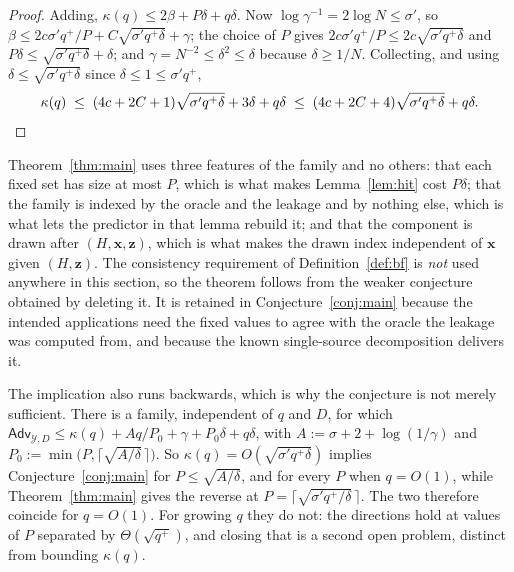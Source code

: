 \documentclass{conjura-conjecture}
\newcommand{\Adv}{\mathsf{Adv}}
\newcommand{\vx}{\mathbf{x}}
\newcommand{\vz}{\mathbf{z}}
\begin{document}
\begin{proof}
Adding, $\kappa(q) \le 2\beta + P\delta + q\delta$. Now
$\log \gamma^{-1} = 2\log N \le \sigma'$, so
$\beta \le 2c\sigma' q^{+}/P + C\sqrt{\sigma' q^{+}\delta} + \gamma$; the
choice of $P$ gives $2c\sigma' q^{+}/P \le 2c\sqrt{\sigma' q^{+}\delta}$
and $P\delta \le \sqrt{\sigma' q^{+}\delta} + \delta$; and
$\gamma = N^{-2} \le \delta^{2} \le \delta$ because $\delta \ge 1/N$.
Collecting, and using $\delta \le \sqrt{\sigma' q^{+}\delta}$ since
$\delta \le 1 \le \sigma' q^{+}$,
\[
  \kappa(q) \;\le\; (4c + 2C + 1)\sqrt{\sigma' q^{+}\delta}
  + 3\delta + q\delta
  \;\le\; (4c + 2C + 4)\sqrt{\sigma' q^{+}\delta} + q\delta . \qedhere
\]
\end{proof}

\begin{remark}\label{rem:uses}
Theorem~\ref{thm:main} uses three features of the family and no others: that
each fixed set has size at most $P$, which is what makes
Lemma~\ref{lem:hit} cost $P\delta$; that the family is indexed by the oracle
and the leakage and by nothing else, which is what lets the predictor in
that lemma rebuild it; and that the component is drawn after $(H,\vx,\vz)$,
which is what makes the drawn index independent of $\vx$ given $(H,\vz)$.
The consistency requirement of Definition~\ref{def:bf} is \emph{not} used
anywhere in this section, so the theorem follows from the weaker conjecture
obtained by deleting it. It is retained in Conjecture~\ref{conj:main}
because the intended applications need the fixed values to agree with the
oracle the leakage was computed from, and because the known single-source
decomposition delivers it.
\end{remark}

\begin{remark}\label{rem:reduces}
The implication also runs backwards, which is why the conjecture is not
merely sufficient. There is a family, independent of $q$ and $D$, for which
$\Adv_{\mathcal{Y},D} \le \kappa(q) + Aq/P_0 + \gamma + P_0\delta +
q\delta$, with $A := \sigma + 2 + \log(1/\gamma)$ and
$P_0 := \min\bigl(P, \lceil\sqrt{A/\delta}\,\rceil\bigr)$. So
$\kappa(q) = O(\sqrt{\sigma'q^{+}\delta})$ implies
Conjecture~\ref{conj:main} for $P \le \sqrt{A/\delta}$, and for every $P$
when $q = O(1)$, while Theorem~\ref{thm:main} gives the reverse at
$P = \lceil\sqrt{\sigma'q^{+}/\delta}\,\rceil$. The two therefore coincide
for $q = O(1)$. For growing $q$ they do not: the directions hold at values
of $P$ separated by $\Theta(\sqrt{q^{+}})$, and closing that is a second
open problem, distinct from bounding $\kappa(q)$.
\end{remark}
\end{document}
